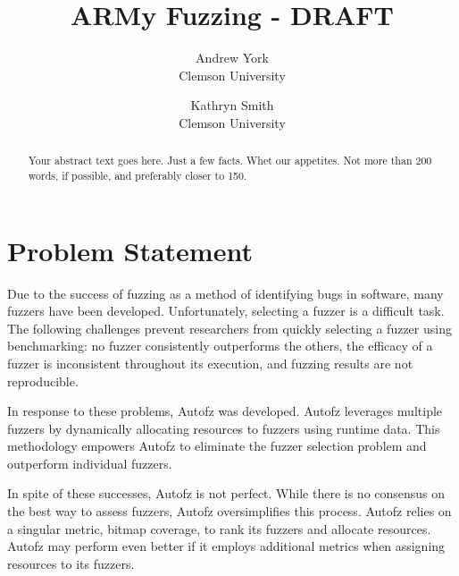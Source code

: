 
\graphicspath{ {./images/} }

\date{}

\title{\Large \bf ARMy Fuzzing - DRAFT}

\author{
{\rm Andrew York}\\
Clemson University
\and
{\rm Kathryn Smith}\\
Clemson University
} %

\maketitle

\begin{abstract}
Your abstract text goes here. Just a few facts. Whet our appetites.
Not more than 200 words, if possible, and preferably closer to 150.
\end{abstract}

\section{Problem Statement}

Due to the success of fuzzing as a method of identifying bugs in software, many fuzzers have been 
developed. Unfortunately, selecting a fuzzer is a difficult task. The following challenges prevent 
researchers from quickly selecting a fuzzer using benchmarking: no fuzzer consistently outperforms 
the others, the efficacy of a fuzzer is inconsistent throughout its execution, and fuzzing results 
are not reproducible.

In response to these problems, Autofz was developed. Autofz leverages multiple fuzzers by dynamically 
allocating resources to fuzzers using runtime data. This methodology empowers Autofz to eliminate the 
fuzzer selection problem and outperform individual fuzzers.

In spite of these successes, Autofz is not perfect. While there is no consensus on the best way to 
assess fuzzers, Autofz oversimplifies this process. Autofz relies on a singular metric, bitmap 
coverage, to rank its fuzzers and allocate resources. Autofz may perform even better if it employs 
additional metrics when assigning resources to its fuzzers.

